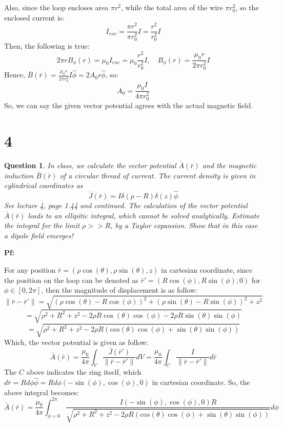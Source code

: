 \documentclass{article}
\newtheorem{question}{Question}
\begin{document}
Also, since the loop encloses area $\pi r^2$, while the total area of the wire $\pi r_{0}^2$, so the enclosed current is:
$$I_{enc}=\frac{\pi r^2}{\pi r_0^2}I = \frac{r^2}{r_0^2}I$$
Then, the following is true:
$$2\pi rB_\phi(r)=\mu_0 I_{enc}=\mu_0\frac{r^2}{r_0^2}I,\quad B_\phi(r)=\frac{\mu_0r}{2\pi r_0^2}I$$
Hence, $\bar{B}(\bar{r})=\frac{\mu_0r}{2\pi r_0^2}I\hat{\phi}=2A_0r\hat{\phi}$, so: 
$$A_0 = \frac{\mu_0I}{4\pi r_0^2}$$
So, we can say the given vector potential agrees with the actual magnetic field.

\break

\section*{4}
\begin{myBox}[]{}
    \begin{question}
        In class, we calculate the vector potential $\bar{A}(\bar{r})$ and the magnetic induction $\bar{B}(\bar{r})$ of a circular
        thread of current. The current density is given in cylindrical coordinates as
        $$\bar{J}(\bar{r})=I\delta(\rho-R)\delta(z)\hat{\phi}$$
        See lecture 4, page 1.44 and continued. The calculation of the vector potential $\bar{A}(\bar{r})$ leads to
        an ellipitic integral, which cannot be solved analytically. Estimate the integral for the limit
        $\rho>> R$, by a Taylor expansion. Show that in this case a dipole field emerges!
    \end{question}
\end{myBox}

\textbf{Pf:}

For any position $\bar{r}=(\rho \cos(\theta),\rho\sin(\theta),z)$ in cartesian coordinate, since the position on the loop can be denoted as $\bar{r}'=(R\cos(\phi),R\sin(\phi),0)$ for $\phi\in[0,2\pi]$,
then the magnitude of displacement is as follow:
$$\|\bar{r}-\bar{r}'\|=\sqrt{(\rho\cos(\theta)-R\cos(\phi))^2+(\rho\sin(\theta)-R\sin(\phi))^2+z^2}$$
$$=\sqrt{\rho^2+R^2+z^2-2\rho R\cos(\theta)\cos(\phi)-2\rho R\sin(\theta)\sin(\phi)}$$
$$=\sqrt{\rho^2+R^2+z^2-2\rho R(cos(\theta)\cos(\phi)+\sin(\theta)\sin(\phi))}$$
Which, the vector potential is given as follow:
$$\bar{A}(\bar{r})=\frac{\mu_0}{4\pi}\int_{V}\frac{\bar{J}(\bar{r}')}{\|\bar{r}-\bar{r}'\|}dV=\frac{\mu_0}{4\pi}\int_{C}\frac{I}{\|\bar{r}-\bar{r}'\|}d\bar{r}$$
The $C$ above indicates the ring itself, which $d\bar{r}=Rd\phi\hat{\phi}=Rd\phi(-\sin(\phi),\cos(\phi),0)$ in cartesian coordinate. So, the above integral becomes:
$$\bar{A}(\bar{r})=\frac{\mu_0}{4\pi}\int_{\phi=0}^{2\pi}\frac{I(-\sin(\phi),\cos(\phi),0)R}{\sqrt{\rho^2+R^2+z^2-2\rho R(cos(\theta)\cos(\phi)+\sin(\theta)\sin(\phi))}}d\phi$$
\end{document}
